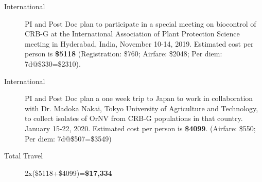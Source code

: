 \documentclass[14pt,english,letterpaper]{scrartcl}
\begin{document}
%
%
%
%
%

\begin{description}
	
	\item[International] PI and Post Doc plan to participate in a special meeting on biocontrol of CRB-G at the International Association of Plant Protection Science meeting in Hyderabad, India, November 10-14, 2019.
Estimated cost per person is \textbf{\$5118} (Registration: \$760; Airfare: \$2048; Per diem: 7d@\$330=\$2310).

	\item[International] PI and Post Doc plan a one week trip to Japan to work in collaboration with Dr. Madoka Nakai, Tokyo University of Agriculture and Technology, to collect isolates of OrNV from CRB-G populations in that country. January 15-22, 2020. Estimated cost per person is \textbf{\$4099}. (Airfare: \$550; Per diem: 7d@\$507=\$3549) 
	
	\item[Total Travel] 2x(\$5118+\$4099)=\textbf{\$17,334}
			
		
\end{description}
\end{document}

